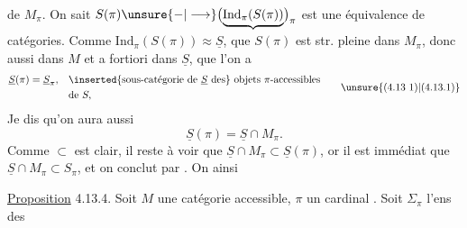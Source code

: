 de $M_\pi$. On sait 
$S(\pi)\unsure{-|\longrightarrow}\bigl(\underbrace{\mathrm{Ind}_\pi(S(\pi))}\bigr)_\pi$ est une équivalence
de catégories. Comme $\mathrm{Ind}_\pi(S(\pi))\approx\underline S$,
 que $S(\pi)$ est str. pleine dans
$M_\pi$, donc aussi dans $M$ et a fortiori
dans $\underline S$, que l'on a
\[
 \begin{aligned}
 \underline S(\pi)=\underline S_\pi,\quad&
 \inserted{\text{sous-catégorie de }\underline S\text{ des}}\ \text{objets }\pi\text{-accessibles}\\
 &\text{de }S,
 \end{aligned}
 \tag*{\unsure{(4.13 1)|(4.13.1)}}
\]
Je dis qu'on aura aussi
\[
 \underline S(\pi)=\underline S\cap M_\pi.\tag*{(4.13.1)}
\]
Comme $\subset$ est clair, il reste à voir
que $\underline S\cap M_\pi\subset\underline S(\pi)$, or il est
immédiat que $\underline S\cap M_\pi\subset S_\pi$, et
on conclut par . On 
ainsi\unsure{:}

\uline{Proposition} 4.13.4. Soit $M$ une
catégorie accessible,  $\pi$ un
cardinal . Soit $\Sigma_\pi$ l'ens des
